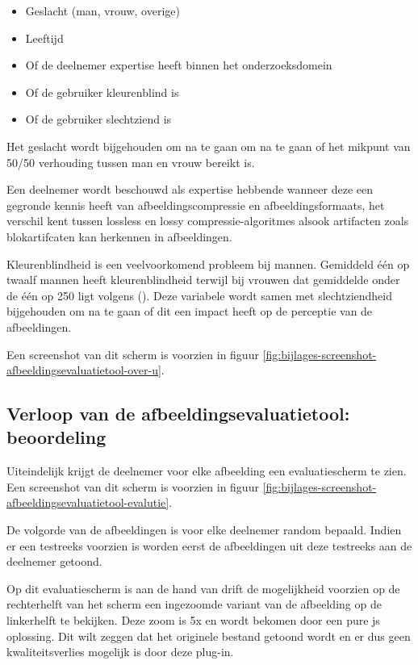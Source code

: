 \begin{itemize}
	\item Geslacht (man, vrouw, overige)
	\item Leeftijd
	\item Of de deelnemer expertise heeft binnen het 
	onderzoeksdomein
	\item Of de gebruiker kleurenblind is
	\item Of de gebruiker slechtziend is
\end{itemize}

Het geslacht wordt bijgehouden om na te gaan om na te gaan of het mikpunt van 50/50 verhouding tussen man en vrouw bereikt is.

Een deelnemer wordt beschouwd als expertise hebbende wanneer deze een gegronde kennis heeft van \gls{afbeeldingscompressie} en \glspl{afbeeldingsformaat}, het verschil kent tussen \gls{lossless} en \gls{lossy} \glspl{compressie-algoritme} alsook artifacten zoals blokartifcaten kan herkennen in afbeeldingen.

Kleurenblindheid is een veelvoorkomend probleem bij mannen. Gemiddeld één op twaalf mannen heeft kleurenblindheid terwijl bij vrouwen dat gemiddelde onder de één op 250 ligt volgens  (\cite{porcella2008}). Deze variabele wordt samen met slechtziendheid bijgehouden om na te gaan of dit een impact heeft op de perceptie van de afbeeldingen.

Een screenshot van dit scherm is voorzien in figuur \ref{fig:bijlages-screenshot-afbeeldingsevaluatietool-over-u}.

\subsection{Verloop  van de afbeeldingsevaluatietool: beoordeling}
\label{sec:onderzoek-evaluatietool-verloop-beoordeling}

Uiteindelijk krijgt de deelnemer voor elke afbeelding een evaluatiescherm te zien. Een screenshot van dit scherm is voorzien in figuur \ref{fig:bijlages-screenshot-afbeeldingsevaluatietool-evalutie}.

De volgorde van de afbeeldingen is voor elke deelnemer random bepaald. Indien er een testreeks voorzien is worden eerst de afbeeldingen uit deze testreeks aan de deelnemer getoond.

Op dit evaluatiescherm is aan de hand van \gls{drift} de mogelijkheid voorzien op de rechterhelft van het scherm een ingezoomde variant van de afbeelding op de linkerhelft te bekijken. Deze zoom is 5x en wordt bekomen door een pure \gls{js} oplossing. Dit wilt zeggen dat het originele bestand getoond wordt en er dus geen kwaliteitsverlies mogelijk is door deze \gls{plug-in}.

